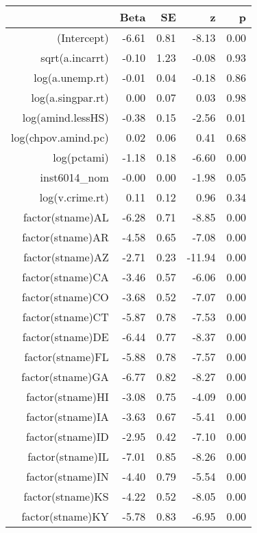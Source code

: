 \begin{table}[ht]
\centering
\begin{tabular}{rrrrr}
  \hline
 & Beta & SE & z & p \\ 
  \hline
(Intercept) & -6.61 & 0.81 & -8.13 & 0.00 \\ 
  sqrt(a.incarrt) & -0.10 & 1.23 & -0.08 & 0.93 \\ 
  log(a.unemp.rt) & -0.01 & 0.04 & -0.18 & 0.86 \\ 
  log(a.singpar.rt) & 0.00 & 0.07 & 0.03 & 0.98 \\ 
  log(amind.lessHS) & -0.38 & 0.15 & -2.56 & 0.01 \\ 
  log(chpov.amind.pc) & 0.02 & 0.06 & 0.41 & 0.68 \\ 
  log(pctami) & -1.18 & 0.18 & -6.60 & 0.00 \\ 
  inst6014\_nom & -0.00 & 0.00 & -1.98 & 0.05 \\ 
  log(v.crime.rt) & 0.11 & 0.12 & 0.96 & 0.34 \\ 
  factor(stname)AL & -6.28 & 0.71 & -8.85 & 0.00 \\ 
  factor(stname)AR & -4.58 & 0.65 & -7.08 & 0.00 \\ 
  factor(stname)AZ & -2.71 & 0.23 & -11.94 & 0.00 \\ 
  factor(stname)CA & -3.46 & 0.57 & -6.06 & 0.00 \\ 
  factor(stname)CO & -3.68 & 0.52 & -7.07 & 0.00 \\ 
  factor(stname)CT & -5.87 & 0.78 & -7.53 & 0.00 \\ 
  factor(stname)DE & -6.44 & 0.77 & -8.37 & 0.00 \\ 
  factor(stname)FL & -5.88 & 0.78 & -7.57 & 0.00 \\ 
  factor(stname)GA & -6.77 & 0.82 & -8.27 & 0.00 \\ 
  factor(stname)HI & -3.08 & 0.75 & -4.09 & 0.00 \\ 
  factor(stname)IA & -3.63 & 0.67 & -5.41 & 0.00 \\ 
  factor(stname)ID & -2.95 & 0.42 & -7.10 & 0.00 \\ 
  factor(stname)IL & -7.01 & 0.85 & -8.26 & 0.00 \\ 
  factor(stname)IN & -4.40 & 0.79 & -5.54 & 0.00 \\ 
  factor(stname)KS & -4.22 & 0.52 & -8.05 & 0.00 \\ 
  factor(stname)KY & -5.78 & 0.83 & -6.95 & 0.00 \\ 

\end{tabular}
\end{table}
